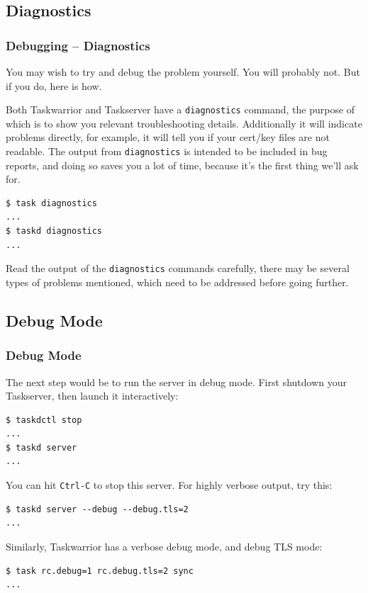 \documentclass[t,handout]{beamer}
\begin{document}
\subsection{Diagnostics}

\begin{frame}[fragile]\frametitle{Debugging -- Diagnostics}
      You may wish to try and debug the problem yourself. You will probably not. But if you do, here is how.

      Both Taskwarrior and Taskserver have a \verb+diagnostics+ command, the purpose of which is to show you relevant troubleshooting details. Additionally it will indicate problems directly, for example, it will tell you if your cert/key files are not readable. The output from \verb+diagnostics+ is intended to be included in bug reports, and doing so saves you a lot of time, because it's the first thing we'll ask for.

      \begin{lstlisting}
$ task diagnostics
...
$ taskd diagnostics
...\end{lstlisting}

    Read the output of the \verb+diagnostics+ commands carefully, there may be several types of problems mentioned, which need to be addressed before going further.
\end{frame}

\subsection{Debug Mode}

\begin{frame}[fragile]\frametitle{Debug Mode}
    The next step would be to run the server in debug mode. First shutdown your Taskserver, then launch it interactively:

    \begin{lstlisting}
$ taskdctl stop
...
$ taskd server
...\end{lstlisting}

    You can hit \verb+Ctrl-C+ to stop this server. For highly verbose output, try this:
    \begin{lstlisting}
$ taskd server --debug --debug.tls=2
...\end{lstlisting}

    Similarly, Taskwarrior has a verbose debug mode, and debug TLS mode:
    \begin{lstlisting}
$ task rc.debug=1 rc.debug.tls=2 sync
...\end{lstlisting}
\end{frame}
\end{document}
